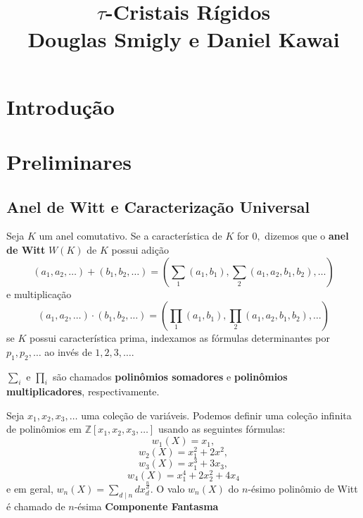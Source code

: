 \documentclass[11pt,twoside,a4paper]{book}
\title{$\tau$-Cristais Rígidos \\  Douglas Smigly e Daniel Kawai}
\author{}
\date{}
\begin{document}
\maketitle

\tableofcontents

\newpage

\chapter*{Introdução}

\chapter{Preliminares}

\section{Anel de Witt e Caracterização Universal}
\begin{definicao}
Seja $K$ um anel comutativo. Se a característica de $K$ for $0,$ dizemos que o \textbf{anel de Witt} $W(K)$ de $K$ possui adição
\[
(a_1, a_2, \ldots ) + (b_1, b_2, \ldots ) = \left( \sum_1 (a_1, b_1), \sum_2(a_1, a_2, b_1, b_2), \ldots \right)
\]
e multiplicação
\[
(a_1, a_2, \ldots ) \cdot (b_1, b_2, \ldots ) = \left( \prod_1 (a_1, b_1), \prod_2(a_1, a_2, b_1, b_2), \ldots \right)
\]
se $K$ possui característica prima, indexamos as fórmulas determinantes por $p_1, p_2, \ldots$ ao invés de $1, 2, 3, \ldots$.

$\sum_i$ e $\prod_i$ são chamados \textbf{polinômios somadores} e \textbf{polinômios multiplicadores}, respectivamente.
\end{definicao}
\begin{definicao} 
Seja $x_1, x_2, x_3, \ldots$ uma coleção de variáveis. Podemos definir uma coleção infinita de polinômios em $\mathbb{Z}[x_1, x_2, x_3, \ldots ]$ usando as seguintes fórmulas:
\[
w_1(X) = x_1,
\]
\[
w_2(X) = x_1^2 + 2x^2,
\]
\[
w_3(X) = x_1^3 + 3x_3,
\]
\[
w_4(X) = x_1^4 + 2x_2^2 + 4x_4 
\]
e em geral, $w_n(X) = \sum\limits_{d \mid n} d x_d^{\frac{n}{d}}.$ O valo $w_n(X)$ do $n$-ésimo polinômio de Witt é chamado de $n$-ésima \textbf{Componente Fantasma}


\end{definicao}
\end{document}
